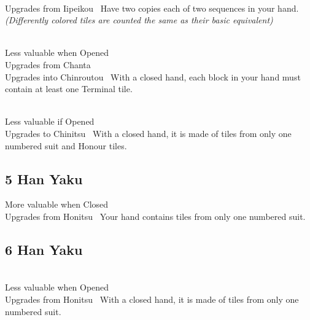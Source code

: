 	{\closedhand \\ 
	\upgradesfrom Upgrades from Iipeikou~}
	{Have two copies each of two sequences in your hand. \textit{(Differently colored tiles are counted the same as their basic equivalent)}}

	{\closedhand \\ 
	\lessvaluable Less valuable when Opened~\\
	\upgradesfrom Upgrades from Chanta~ \\
	\upgradesto Upgrades into Chinroutou~}
	{With a closed hand, each block in your hand must contain at least one Terminal tile.}

	{\closedhand \\
	\morevaluable Less valuable if Opened~\\
	\upgradesto Upgrades to Chinitsu~}
	{With a closed hand, it is made of tiles from only one numbered suit and Honour tiles.}


\subsection{5 Han Yaku}\label{core:ssec:5-han-yaku}

	{\morevaluable More valuable when Closed~ \\
	\upgradesfrom Upgrades from Honitsu~}
	{Your hand contains tiles from only one numbered suit.}


\subsection{6 Han Yaku}\label{core:ssec:6-han-yaku}

	{\closedhand \\
	\lessvaluable Less valuable when Opened~ \\
	\upgradesfrom Upgrades from Honitsu~}
	{With a closed hand, it is made of tiles from only one numbered suit.}

